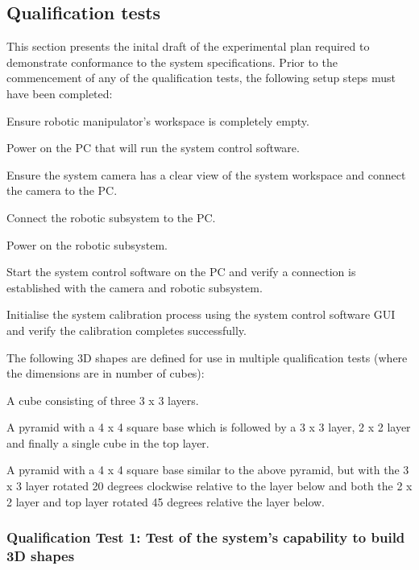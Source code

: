 \subsection{Qualification tests}

This section presents the inital draft of the experimental plan required to demonstrate conformance to the system specifications. Prior to the commencement of any of the qualification tests, the following setup steps must have been completed:

\begin{compactenum}
	\item Ensure robotic manipulator's workspace is completely empty.
	\item Power on the PC that will run the system control software.
	\item Ensure the system camera has a clear view of the system workspace and connect the camera to the PC.
	\item Connect the robotic subsystem to the PC.
	\item Power on the robotic subsystem.
	\item Start the system control software on the PC and verify a connection is established with the camera and robotic subsystem.
	\item Initialise the system calibration process using the system control software GUI and verify the calibration completes successfully.
\end{compactenum}

The following 3D shapes are defined for use in multiple qualification tests (where the dimensions are in number of cubes):

\begin{compactenum}
	\item A cube consisting of three 3 x 3 layers.
	\item A pyramid with a 4 x 4 square base which is followed by a 3 x 3 layer, 2 x 2 layer and finally a single cube in the top layer.
	\item A pyramid with a 4 x 4 square base similar to the above pyramid, but with the 3 x 3 layer rotated 20 degrees clockwise relative to the layer below and both the 2 x 2 layer and top layer rotated 45 degrees relative the layer below.
\end{compactenum}

\subsubsection{Qualification Test 1: Test of the system's capability to build 3D shapes}

